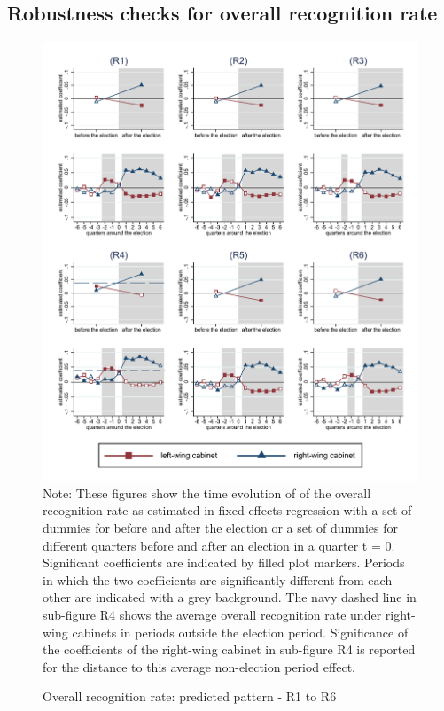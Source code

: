 \documentclass[11pt,a4paper]{scrartcl}
\begin{document}

\clearpage
\FloatBarrier
\subsection{Robustness checks for overall recognition rate}



\clearpage
\FloatBarrier
\begin{figure}[!ht]
	\caption{Overall recognition rate: predicted pattern - R1 to R6}
	\includegraphics[width=1\textwidth]{../results/decisions/acceptance_rate_graphs_R1-R6.pdf}
	\scriptsize{Note: These figures show the time evolution of of the overall recognition rate as estimated in fixed effects regression with a set of dummies for before and after the election or a set of dummies for different quarters before and after an election in a quarter t = 0. Significant coefficients are indicated by filled plot markers. Periods in which the two coefficients are significantly different from each other are indicated with a grey background. The navy dashed line in sub-figure R4 shows the average overall recognition rate under right-wing cabinets in periods outside the election period. Significance of the coefficients of the right-wing cabinet in sub-figure R4 is reported for the distance to this average non-election period effect.}
\end{figure}
\end{document}
